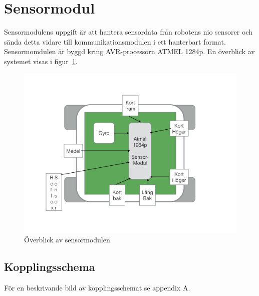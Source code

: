 \documentclass[a4paper,12pt,fleqn]{article}
\begin{document}
\newpage



\section{Sensormodul}
Sensormodulens uppgift är att hantera sensordata från robotens nio sensorer och sända detta vidare till kommunikationsmodulen i ett hanterbart format. Sensormomdulen är byggd kring AVR-processorn ATMEL 1284p. En överblick av systemet visas i figur~\ref{fig:sensoroverview}.

\begin{figure}[htp] %
  \begin{center}
  \includegraphics[keepaspectratio=true,width=\linewidth]{bilder/overblicksensor}  %
  \end{center}
  \caption{Överblick av sensormodulen} %
  \label{fig:sensoroverview}
\end{figure}

\subsection{Kopplingsschema}

För en beskrivande bild av kopplingsschemat se appendix A.
\end{document}

